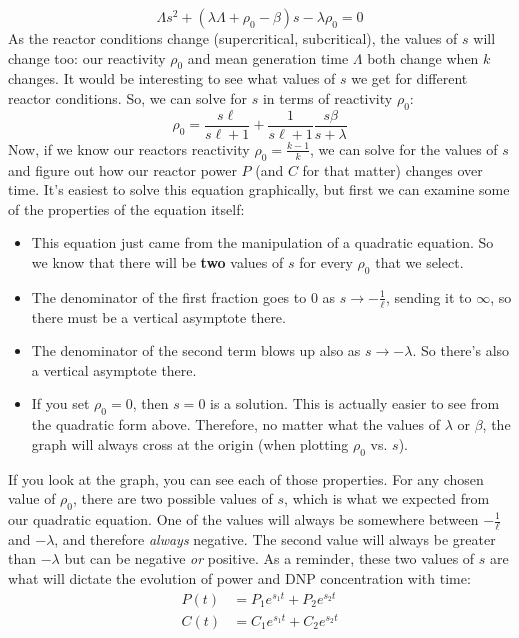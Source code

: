 \documentclass[letter]{article}
\begin{document}
\begin{equation*}
    \Lambda{}s^2+(\lambda\Lambda+\rho_0-\beta)s-\lambda\rho_0=0
\end{equation*}
As the reactor conditions change (supercritical, subcritical), the values of $s$ will change too:
our reactivity $\rho_0$ and mean generation time $\Lambda$ both change
when $k$ changes. It would be interesting to see what values of $s$ we
get for different reactor conditions. So, we can solve for $s$ in
terms of reactivity $\rho_0$:
\begin{equation*}
  \rho_0=\frac{s\ell}{s\ell+1}+\frac{1}{s\ell+1}\frac{s\beta}{s+\lambda}
\end{equation*}
Now, if we know our reactors reactivity $\rho_0=\frac{k-1}{k}$, we can
solve for the values of $s$ and figure out how our reactor power $P$
(and $C$ for that matter) changes over time. It's easiest to solve
this equation graphically, but first we can examine some of the
properties of the equation itself:

\begin{itemize}
\item This equation just came from the manipulation of a quadratic
  equation. So we know that there will be \textbf{two} values of $s$
  for every $\rho_0$ that we select.
\item The denominator of the first fraction goes to 0 as $s \to
  -\frac{1}{\ell}$, sending it to $\infty$, so there must be a
  vertical asymptote there.
\item The denominator of the second term blows up also as $s \to
  -\lambda$. So there's also a vertical asymptote there.
\item If you set $\rho_0=0$, then $s=0$ is a solution. This is
  actually easier to see from the quadratic form above. Therefore, no
  matter what the values of $\lambda$ or $\beta$, the graph will
  always cross at the origin (when plotting $\rho_0$ vs. $s$).
\end{itemize}

If you look at the graph, you can see each of those properties. For
any chosen value of $\rho_0$, there are two possible values of $s$,
which is what we expected from our quadratic equation. One of the
values will always be somewhere between $-\frac{1}{\ell}$ and
$-\lambda$, and therefore \textit{always} negative. The second value
will always be greater than $-\lambda$ but can be negative \textit{or}
positive. As a reminder, these two values of $s$ are what will dictate
the evolution of power and DNP concentration with time:
\begin{equation*}
  \begin{split}
    P(t)&=P_1e^{s_1t}+P_2e^{s_2t} \\
    C(t)&=C_1e^{s_1t}+C_2e^{s_2t}
  \end{split}
\end{equation*}
\end{document}
